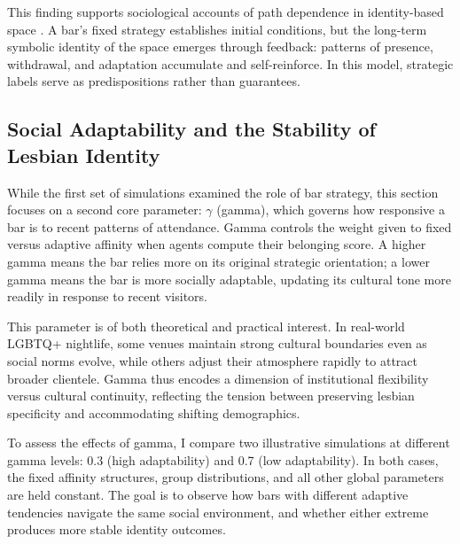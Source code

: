 \documentclass{article}
\begin{document}
This finding supports sociological accounts of path dependence in identity-based space \citep{podmore2006}. A bar’s fixed strategy establishes initial conditions, but the long-term symbolic identity of the space emerges through feedback: patterns of presence, withdrawal, and adaptation accumulate and self-reinforce. In this model, strategic labels serve as predispositions rather than guarantees.

\subsection{Social Adaptability and the Stability of Lesbian Identity}

While the first set of simulations examined the role of bar strategy, this section focuses on a second core parameter: $\gamma$ (gamma), which governs how responsive a bar is to recent patterns of attendance. Gamma controls the weight given to fixed versus adaptive affinity when agents compute their belonging score. A higher gamma means the bar relies more on its original strategic orientation; a lower gamma means the bar is more socially adaptable, updating its cultural tone more readily in response to recent visitors.

This parameter is of both theoretical and practical interest. In real-world LGBTQ+ nightlife, some venues maintain strong cultural boundaries even as social norms evolve, while others adjust their atmosphere rapidly to attract broader clientele. Gamma thus encodes a dimension of institutional flexibility versus cultural continuity, reflecting the tension between preserving lesbian specificity and accommodating shifting demographics.

To assess the effects of gamma, I compare two illustrative simulations at different gamma levels: 0.3 (high adaptability) and 0.7 (low adaptability). In both cases, the fixed affinity structures, group distributions, and all other global parameters are held constant. The goal is to observe how bars with different adaptive tendencies navigate the same social environment, and whether either extreme produces more stable identity outcomes.
\end{document}
